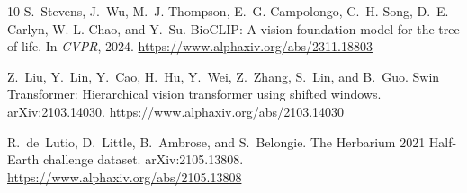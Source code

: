 \documentclass[11pt]{article}
\begin{document}
\begin{thebibliography}{10}
S.~Stevens, J.~Wu, M.~J. Thompson, E.~G. Campolongo, C.~H. Song, D.~E. Carlyn,
  W.-L. Chao, and Y.~Su.
\newblock BioCLIP: A vision foundation model for the tree of life.
\newblock In \emph{CVPR}, 2024.
\newblock \url{https://www.alphaxiv.org/abs/2311.18803}

Z.~Liu, Y.~Lin, Y.~Cao, H.~Hu, Y.~Wei, Z.~Zhang, S.~Lin, and B.~Guo.
\newblock Swin Transformer: Hierarchical vision transformer using shifted
  windows.
\newblock arXiv:2103.14030.
\newblock \url{https://www.alphaxiv.org/abs/2103.14030}

R.~de~Lutio, D.~Little, B.~Ambrose, and S.~Belongie.
\newblock The Herbarium 2021 Half-Earth challenge dataset.
\newblock arXiv:2105.13808.
\newblock \url{https://www.alphaxiv.org/abs/2105.13808}

\end{thebibliography}
\end{document}
